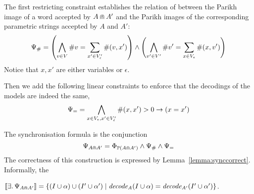 \documentclass[sigplan,review,anonymous]{acmart}\settopmatter{printfolios=true,printccs=false,printacmref=false}
\begin{document}
The first restricting constraint establishes the relation of between the Parikh image of a word accepted by $A \Cap A'$ and the Parikh images of the corresponding parametric strings accepted by $A$ and ${A'}$:
$$ \Psi_{\#} = 
\left(\bigwedge_{v\in V}\#v = \sum_{x' \in V'_\epsilon} \#{(v,x')}\right)
\land
\left(\bigwedge_{v'\in V'} \#v' = \sum_{x \in V_\epsilon} \#{(x,v')}\right)
$$
Notice that $x,x'$ are either variables or $\epsilon$.

Then we add the following linear constraints to enforce that the decodings of the models are indeed the same, 
$$ \Psi_= =
\bigwedge_{x\in V_\epsilon,x'\in V'_\epsilon} \#(x,x')>0 \rightarrow (x=x')
$$

The synchronisation formula is the conjunction 
$$\label{lemma:synccorrect}
\Psi_{A \Cap A'} = \Phi_{\mathbb{P}{(A \Cap A')}} \land \Psi_{\#} \land \Psi_=
$$
The correctness of this construction is expressed by Lemma~\ref{lemma:synccorrect}. Informally,
the 

\begin{lemma}
 $[\![\exists .\,\Psi_{A \Cap A'}]\!] = \{(I\cup\alpha)\cup(I'\cup\alpha') \mid \mathit{decode_{A}}(I\cup\alpha) = \mathit{decode_{A'}}(I'\cup\alpha')\}$. 
\end{lemma}

\end{document}
